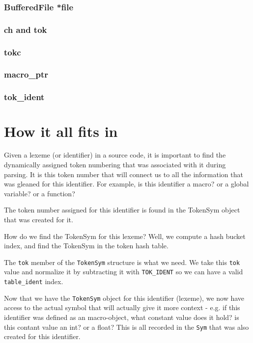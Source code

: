 \subsubsection{BufferedFile *file}

\subsubsection{ch and tok}

\subsubsection{tokc}

\subsubsection{macro\_ptr}

\subsubsection{tok\_ident}

\section{How it all fits in}

Given a lexeme (or identifier) in a source code, it is important to find the dynamically assigned token numbering that was associated with it during parsing. It is this token number that will connect us to all the information that was gleaned for this identifier. For example, is this identifier a macro? or a global variable? or a function? 

The token number assigned for this identifier is found in the TokenSym object that was created for it. 

How do we find the TokenSym for this lexeme? Well, we compute a hash bucket index, and find the TokenSym in the token hash table.

The \verb|tok| member of the \verb|TokenSym| structure is what we need. We take this \verb|tok| value and normalize it by subtracting it with \verb|TOK_IDENT| so we can have a valid \verb|table_ident| index.

Now that we have the \verb|TokenSym| object for this identifier (lexeme), we now have access to the actual symbol that will actually give it more context - e.g. if this identifier was defined as an macro-object, what constant value does it hold? is this contant value an int? or a float? This is all recorded in the \verb|Sym| that was also created for this identifier.
